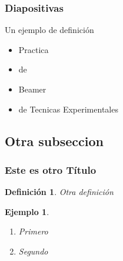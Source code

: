 \documentclass{beamer}
\newtheorem{definicion}{Definición}
\newtheorem{ejemplo}{Ejemplo}
\begin{document}
\begin{frame}
\frametitle{Diapositivas}

\begin{definition}
  Un ejemplo de definición
\end{definition}

\begin{example}
  \begin{itemize}
    \item <1-> Practica\pause
    \item <2-> de \pause
    \item <3-> Beamer \pause
    \item <4-> de \alert{Tecnicas Experimentales}~\cite{guia}   
  \end{itemize}
\end{example}

\end{frame}

\subsection{Otra subseccion}
\begin{frame}
\frametitle{Este es otro Título}

\begin{definicion}
  Otra definición 
\end{definicion}

\begin{ejemplo}
  \begin{enumerate}
    \item
      Primero
      \pause

    \item
      Segundo 

  \end{enumerate}
\end{ejemplo}

\end{frame}
\end{document}
